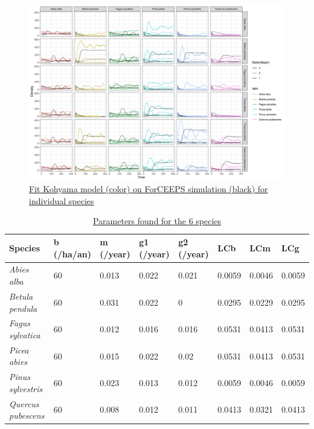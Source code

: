 \documentclass{article}
\begin{document}
\begin{figure}
    \includegraphics[width=\textwidth]{Figure/Parametrisation/Simulation_fit.png}
    \caption{\underline{Fit Kohyama model (color) on ForCEEPS simulation (black) for individual species}}
    \label{fig:Simulation_fit}
\end{figure}

\begin{table}[H]
\begin{center}
    \begin{tabular}{llllllll}
    \hline
    Species & b (/ha/an) & m (/year) & g1 (/year) & g2 (/year) & LCb & LCm & LCg \\ \hline
    \textit{Abies alba}       & 60 & 0.013 & 0.022 & 0.021 & 0.0059 & 0.0046 & 0.0059 \\
    \textit{Betula pendula}   & 60 & 0.031 & 0.022 & 0     & 0.0295 & 0.0229 & 0.0295 \\
    \textit{Fagus sylvatica}  & 60 & 0.012 & 0.016 & 0.016 & 0.0531 & 0.0413 & 0.0531 \\
    \textit{Picea abies}      & 60 & 0.015 & 0.022 & 0.02  & 0.0531 & 0.0413 & 0.0531 \\
    \textit{Pinus sylvestris} & 60 & 0.023 & 0.013 & 0.012 & 0.0059 & 0.0046 & 0.0059 \\
    \textit{Quercus pubescens}& 60 & 0.008 & 0.012 & 0.011 & 0.0413 & 0.0321 & 0.0413 \\ \hline
    \end{tabular}
    \caption{\underline{Parameters found for the 6 species}}
    \label{tab:Final_param}
\end{center}
\end{table}
\end{document}
